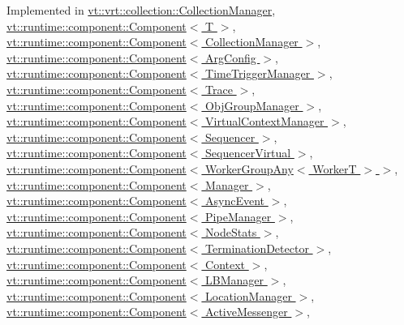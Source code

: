 Implemented in \hyperlink{structvt_1_1vrt_1_1collection_1_1_collection_manager_ac71095016a20dd9607f2f937bf35305e}{vt\+::vrt\+::collection\+::\+Collection\+Manager}, \hyperlink{structvt_1_1runtime_1_1component_1_1_component_aad3974307ab3b2e1df389a91310f68c2}{vt\+::runtime\+::component\+::\+Component$<$ T $>$}, \hyperlink{structvt_1_1runtime_1_1component_1_1_component_aad3974307ab3b2e1df389a91310f68c2}{vt\+::runtime\+::component\+::\+Component$<$ Collection\+Manager $>$}, \hyperlink{structvt_1_1runtime_1_1component_1_1_component_aad3974307ab3b2e1df389a91310f68c2}{vt\+::runtime\+::component\+::\+Component$<$ Arg\+Config $>$}, \hyperlink{structvt_1_1runtime_1_1component_1_1_component_aad3974307ab3b2e1df389a91310f68c2}{vt\+::runtime\+::component\+::\+Component$<$ Time\+Trigger\+Manager $>$}, \hyperlink{structvt_1_1runtime_1_1component_1_1_component_aad3974307ab3b2e1df389a91310f68c2}{vt\+::runtime\+::component\+::\+Component$<$ Trace $>$}, \hyperlink{structvt_1_1runtime_1_1component_1_1_component_aad3974307ab3b2e1df389a91310f68c2}{vt\+::runtime\+::component\+::\+Component$<$ Obj\+Group\+Manager $>$}, \hyperlink{structvt_1_1runtime_1_1component_1_1_component_aad3974307ab3b2e1df389a91310f68c2}{vt\+::runtime\+::component\+::\+Component$<$ Virtual\+Context\+Manager $>$}, \hyperlink{structvt_1_1runtime_1_1component_1_1_component_aad3974307ab3b2e1df389a91310f68c2}{vt\+::runtime\+::component\+::\+Component$<$ Sequencer $>$}, \hyperlink{structvt_1_1runtime_1_1component_1_1_component_aad3974307ab3b2e1df389a91310f68c2}{vt\+::runtime\+::component\+::\+Component$<$ Sequencer\+Virtual $>$}, \hyperlink{structvt_1_1runtime_1_1component_1_1_component_aad3974307ab3b2e1df389a91310f68c2}{vt\+::runtime\+::component\+::\+Component$<$ Worker\+Group\+Any$<$ Worker\+T $>$ $>$}, \hyperlink{structvt_1_1runtime_1_1component_1_1_component_aad3974307ab3b2e1df389a91310f68c2}{vt\+::runtime\+::component\+::\+Component$<$ Manager $>$}, \hyperlink{structvt_1_1runtime_1_1component_1_1_component_aad3974307ab3b2e1df389a91310f68c2}{vt\+::runtime\+::component\+::\+Component$<$ Async\+Event $>$}, \hyperlink{structvt_1_1runtime_1_1component_1_1_component_aad3974307ab3b2e1df389a91310f68c2}{vt\+::runtime\+::component\+::\+Component$<$ Pipe\+Manager $>$}, \hyperlink{structvt_1_1runtime_1_1component_1_1_component_aad3974307ab3b2e1df389a91310f68c2}{vt\+::runtime\+::component\+::\+Component$<$ Node\+Stats $>$}, \hyperlink{structvt_1_1runtime_1_1component_1_1_component_aad3974307ab3b2e1df389a91310f68c2}{vt\+::runtime\+::component\+::\+Component$<$ Termination\+Detector $>$}, \hyperlink{structvt_1_1runtime_1_1component_1_1_component_aad3974307ab3b2e1df389a91310f68c2}{vt\+::runtime\+::component\+::\+Component$<$ Context $>$}, \hyperlink{structvt_1_1runtime_1_1component_1_1_component_aad3974307ab3b2e1df389a91310f68c2}{vt\+::runtime\+::component\+::\+Component$<$ L\+B\+Manager $>$}, \hyperlink{structvt_1_1runtime_1_1component_1_1_component_aad3974307ab3b2e1df389a91310f68c2}{vt\+::runtime\+::component\+::\+Component$<$ Location\+Manager $>$}, \hyperlink{structvt_1_1runtime_1_1component_1_1_component_aad3974307ab3b2e1df389a91310f68c2}{vt\+::runtime\+::component\+::\+Component$<$ Active\+Messenger $>$}, 